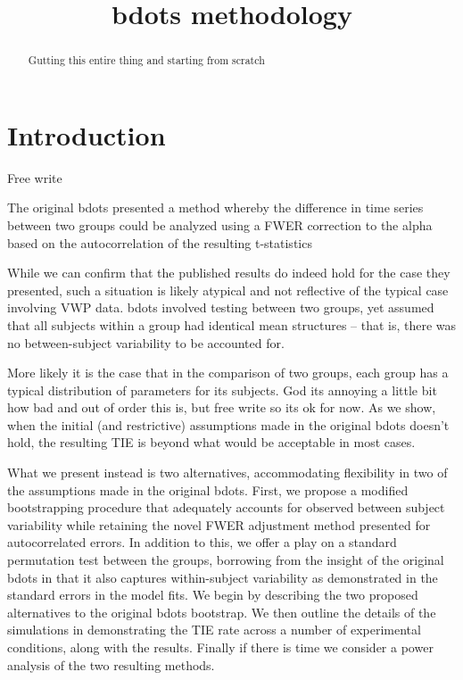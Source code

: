 \documentclass{article}
\title{bdots methodology}
\date{}
\begin{document}

\maketitle

%

\begin{abstract}
Gutting this entire thing and starting from scratch


\end{abstract}

\section{Introduction}

Free write

The original bdots presented a method whereby the difference in time series between two groups could be analyzed using a FWER correction to the alpha based on the autocorrelation of the resulting t-statistics

While we can confirm that the published results do indeed hold for the case they presented, such a situation is likely atypical and not reflective of the typical case involving VWP data. bdots involved testing between two groups, yet assumed that all subjects within a group had identical mean structures -- that is, there was no between-subject variability to be accounted for.

More likely it is the case that in the comparison of two groups, each group has a typical distribution of parameters for its subjects. God its annoying a little bit how bad and out of order this is, but free write so its ok for now. As we show, when the initial (and restrictive) assumptions made in the original bdots doesn't hold, the resulting TIE is beyond what would be acceptable in most cases.

What we present instead is two alternatives, accommodating flexibility in two of the assumptions made in the original bdots. First, we propose a modified bootstrapping procedure that adequately accounts for observed between subject variability while retaining the novel FWER adjustment method presented for autocorrelated errors. In addition to this, we offer a play on a standard permutation test between the groups, borrowing from the insight of the original bdots in that it also captures within-subject variability as demonstrated in the standard errors in the model fits. We begin by describing the two proposed alternatives to the original bdots bootstrap. We then outline the details of the simulations in demonstrating the TIE rate across a number of experimental conditions, along with the results. Finally if there is time we consider a power analysis of the two resulting methods.
\end{document}

